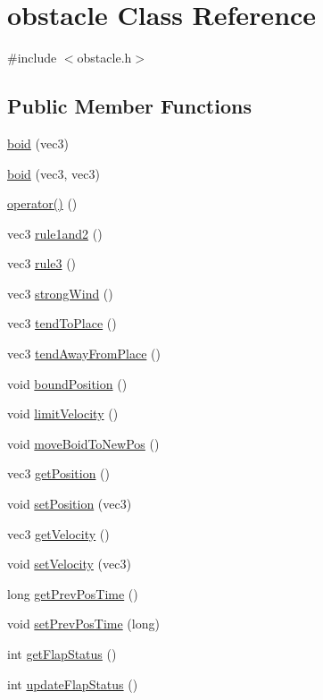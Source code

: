 \hypertarget{classobstacle}{}\section{obstacle Class Reference}
\label{classobstacle}


{\ttfamily \#include $<$obstacle.\+h$>$}

\subsection*{Public Member Functions}
\begin{DoxyCompactItemize}
\item 
\mbox{\hyperlink{classobstacle_abcaa89feecd5d64beeb2c5b6862ea6ae}{boid}} (vec3)
\item 
\mbox{\hyperlink{classobstacle_a162c493ffaf30b68495fb927414962c1}{boid}} (vec3, vec3)
\item 
\mbox{\hyperlink{classobstacle_a6a0499c0ae24d0b554527bd93a7c8c97}{operator()}} ()
\item 
vec3 \mbox{\hyperlink{classobstacle_a7f0520183cb9c8a7edfe977cc7e7cca9}{rule1and2}} ()
\item 
vec3 \mbox{\hyperlink{classobstacle_abc29860de93b1d83dd80f98f70b19554}{rule3}} ()
\item 
vec3 \mbox{\hyperlink{classobstacle_aefbfa049ac32d9bf938e8abd3660d650}{strong\+Wind}} ()
\item 
vec3 \mbox{\hyperlink{classobstacle_aaee06f5eb44efbe0ed7ea035eeb86d38}{tend\+To\+Place}} ()
\item 
vec3 \mbox{\hyperlink{classobstacle_a791873b051c097fe6df330bf7b723555}{tend\+Away\+From\+Place}} ()
\item 
void \mbox{\hyperlink{classobstacle_a17369fa497590d9cab34563ff465918d}{bound\+Position}} ()
\item 
void \mbox{\hyperlink{classobstacle_a3f291286885f30c88f7b8feefebcd8f6}{limit\+Velocity}} ()
\item 
void \mbox{\hyperlink{classobstacle_a53b6085a360d48259d61d2f90e8f34d5}{move\+Boid\+To\+New\+Pos}} ()
\item 
vec3 \mbox{\hyperlink{classobstacle_adac0ac53796ad022421322a47cc237f1}{get\+Position}} ()
\item 
void \mbox{\hyperlink{classobstacle_ac32e907563b7f824f07a41fe665a899c}{set\+Position}} (vec3)
\item 
vec3 \mbox{\hyperlink{classobstacle_a113bdf5134eb546d016594aecaac21d1}{get\+Velocity}} ()
\item 
void \mbox{\hyperlink{classobstacle_adfe6fe1978d265084184e0f3e4c4b97b}{set\+Velocity}} (vec3)
\item 
long \mbox{\hyperlink{classobstacle_ac47b2829af82756c780542c2891792c2}{get\+Prev\+Pos\+Time}} ()
\item 
void \mbox{\hyperlink{classobstacle_acda53aa0ed77badcbf9198b6537c2ecc}{set\+Prev\+Pos\+Time}} (long)
\item 
int \mbox{\hyperlink{classobstacle_aecd1f6f0a9bba04a29e2029f2ba7b765}{get\+Flap\+Status}} ()
\item 
int \mbox{\hyperlink{classobstacle_aebf13f8cf93fee557ac014b8fcc667c7}{update\+Flap\+Status}} ()
\end{DoxyCompactItemize}
